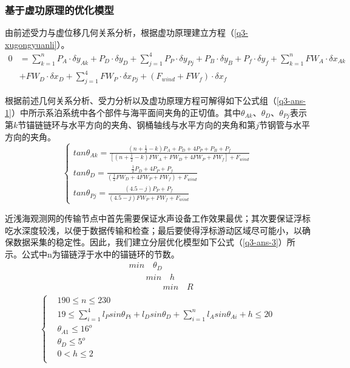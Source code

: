 \documentclass[withoutpreface,bwprint]{cumcmthesis} %
\begin{document}
\subsubsection{基于虚功原理的优化模型}
\par 由前述受力与虚位移几何关系分析，根据虚功原理建立方程（\ref{q3-xugongyuanli}）。
\begin{equation}
	\label{q3-xugongyuanli}
	\begin{split}
		0 &= \sum\limits_{k=1}^{n} P_A \cdot \delta y_{Ak} + P_D \cdot \delta y_{D} + \sum\limits_{j=1}^{4} P_P \cdot \delta y_{Pj} + P_B \cdot \delta y_{B} + P_f \cdot \delta y_{f} + \sum\limits_{k=1}^{n} FW_A \cdot \delta x_{Ak} \\
		& +  FW_D \cdot \delta x_{D} + \sum\limits_{j=1}^{4} FW_P \cdot \delta x_{Pj} +  (F_{wind} + FW_f) \cdot \delta x_{f}		
	\end{split}
\end{equation}
\par 根据前述几何关系分析、受力分析以及虚功原理方程可解得如下公式组（\ref{q3-ans-1}）中所示系泊系统中各个部件与海平面间夹角的正切值。其中$\theta_{Ak}$、$\theta_{D}$、$\theta_{Pj}$表示第$k$节锚链链环与水平方向的夹角、钢桶轴线与水平方向的夹角和第$j$节钢管与水平方向的夹角。
\begin{equation}
	\label{q3-ans-1}
	\left\{
	\begin{array}{lr}
        tan\theta_{Ak} = \frac{(n+\frac{1}{2} - k)P_A +P_D+4P_P+P_B+P_f}{[(n+\frac{1}{2} - k)FW_A +FW_D+4FW_P+FW_f] + F_{wind}} \\
        tan\theta_{D} = \frac{\frac{1}{2}P_D+4P_P+P_f}{(\frac{1}{2}FW_D+4FW_P+FW_f)+F_{wind}}\\
        tan\theta_{Pj} = \frac{(4.5-j)P_P+P_f}{(4.5-j)FW_P+FW_f+F_{wind}}
	\end{array}
	\right.
\end{equation}
\par 近浅海观测网的传输节点中首先需要保证水声设备工作效果最优；其次要保证浮标吃水深度较浅，以便于数据传输和检查；最后要使得浮标游动区域尽可能小，以确保数据采集的稳定性。因此，我们建立分层优化模型如下公式（\ref{q3-ans-3}）所示。公式中n为锚链浮于水中的锚链环的节数。
\[
	\begin{split}
		&min \quad \theta_D \\
		&\qquad min \quad h \\
		&\qquad \qquad min \quad R\\
	\end{split}
\]
\begin{equation}
	\label{q3-ans-3}
	\left\{
	\begin{split}
		& 190 \leqslant n \leqslant 230\\
		& 19 \leqslant \sum\limits_{i=1}^{4}l_P sin \theta_{Pi} + l_D sin \theta_{D} + \sum\limits_{i=1}^{n} l_A sin \theta_{Ai} + h \leqslant 20\\
		& \theta_{A1} \leqslant 16^o \\
		& \theta_{D} \leqslant 5^o \\
		& 0 < h \leqslant 2\\
	\end{split}
	\right.
\end{equation}
\end{document}
